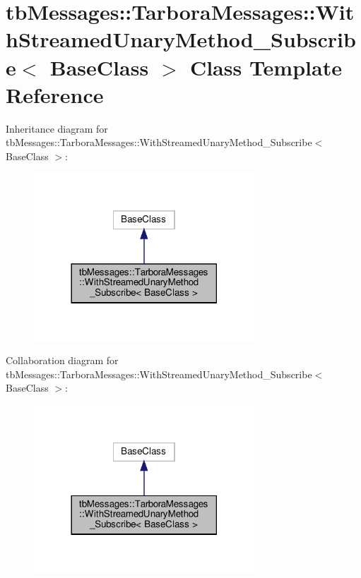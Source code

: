 \hypertarget{classtbMessages_1_1TarboraMessages_1_1WithStreamedUnaryMethod__Subscribe}{}\section{tb\+Messages\+:\+:Tarbora\+Messages\+:\+:With\+Streamed\+Unary\+Method\+\_\+\+Subscribe$<$ Base\+Class $>$ Class Template Reference}
\label{classtbMessages_1_1TarboraMessages_1_1WithStreamedUnaryMethod__Subscribe}


Inheritance diagram for tb\+Messages\+:\+:Tarbora\+Messages\+:\+:With\+Streamed\+Unary\+Method\+\_\+\+Subscribe$<$ Base\+Class $>$\+:
\nopagebreak
\begin{figure}[H]
\begin{center}
\leavevmode
\includegraphics[width=234pt]{classtbMessages_1_1TarboraMessages_1_1WithStreamedUnaryMethod__Subscribe__inherit__graph}
\end{center}
\end{figure}


Collaboration diagram for tb\+Messages\+:\+:Tarbora\+Messages\+:\+:With\+Streamed\+Unary\+Method\+\_\+\+Subscribe$<$ Base\+Class $>$\+:
\nopagebreak
\begin{figure}[H]
\begin{center}
\leavevmode
\includegraphics[width=234pt]{classtbMessages_1_1TarboraMessages_1_1WithStreamedUnaryMethod__Subscribe__coll__graph}
\end{center}
\end{figure}
